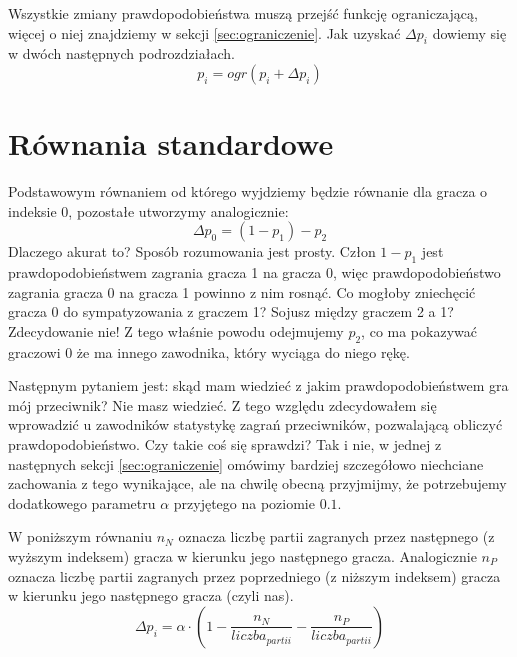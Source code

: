 Wszystkie zmiany prawdopodobieństwa muszą przejść funkcję ograniczającą, więcej o niej znajdziemy w sekcji \ref{sec:ograniczenie}. Jak uzyskać $\Delta p_i$ dowiemy się w dwóch następnych podrozdziałach.
\begin{equation} \label{eq:ograniczenie}
p_i = ogr( p_i + \Delta p_i)
\end{equation}

\section{Równania standardowe}
\label{sec:r_stand}
Podstawowym równaniem od którego wyjdziemy będzie równanie dla gracza o indeksie 0, pozostałe utworzymy analogicznie:
\begin{equation} \label{eq:poczatek}
\Delta p_0 = (1 - p_1) - p_2
\end{equation}
Dlaczego akurat to? Sposób rozumowania jest prosty. Człon $1 - p_1$ jest prawdopodobieństwem zagrania gracza 1 na gracza 0, więc prawdopodobieństwo zagrania gracza 0 na gracza 1 powinno z nim rosnąć. Co mogłoby zniechęcić gracza 0 do sympatyzowania z graczem 1? Sojusz między graczem 2 a 1? Zdecydowanie nie! Z tego właśnie powodu odejmujemy $p_2$, co ma pokazywać graczowi 0 że ma innego zawodnika, który wyciąga do niego rękę.

Następnym pytaniem jest: skąd mam wiedzieć z jakim prawdopodobieństwem gra mój przeciwnik? Nie masz wiedzieć. Z tego względu zdecydowałem się wprowadzić u zawodników statystykę zagrań przeciwników, pozwalającą obliczyć prawdopodobieństwo. Czy takie coś się sprawdzi? Tak i nie, w jednej z następnych sekcji \ref{sec:ograniczenie} omówimy bardziej szczegółowo niechciane zachowania z tego wynikające, ale na chwilę obecną przyjmijmy, że potrzebujemy dodatkowego parametru $\alpha$ przyjętego na poziomie $0.1$.

W poniższym równaniu $n_N$ oznacza liczbę partii zagranych przez następnego (z wyższym indeksem) gracza w kierunku jego następnego gracza. Analogicznie $n_P$ oznacza liczbę partii zagranych przez poprzedniego (z niższym indeksem) gracza w kierunku jego następnego gracza (czyli nas).
\begin{equation} \label{eq:stand}
\Delta p_i = \alpha \cdot (1 - \frac{n_N}{liczba_{partii}} - \frac{n_P}{liczba_{partii}})
\end{equation}

